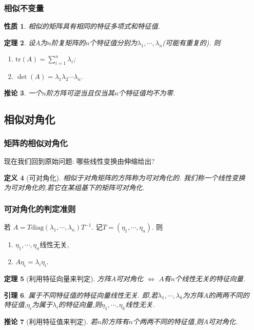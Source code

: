 \documentclass{article}
\newtheorem{theorem}{定理}  %
\newtheorem{proposition}[theorem]{性质}  %
\newtheorem{definition}[theorem]{定义}
\newtheorem{corollary}[theorem]{推论}
\newtheorem{lemma}[theorem]{引理}
\renewcommand{\blue }[1]{{\textcolor[rgb]{0,0,1}{#1}}}
\begin{document}
\subsubsection{相似不变量}
\begin{proposition}
相似的矩阵具有相同的特征多项式和特征值.
\end{proposition}
\begin{theorem}
设$A$为$n$阶复矩阵的$n$个特征值分别为$\lambda_1,\cdots,\lambda_n$(可能有重复的). 则
\begin{enumerate}
\item $\mathrm{tr}(A)=\sum_{i=1}^{n}\lambda_i$;
\item $\det(A)=\lambda_1\lambda_2\cdots\lambda_n$.
\end{enumerate}
\end{theorem}
\begin{corollary}
一个$n$阶方阵可逆当且仅当其$n$个特征值均不为零.
\end{corollary}


\subsection{相似对角化}

\subsubsection{矩阵的相似对角化}
现在我们回到原始问题: 哪些线性变换由伸缩给出?
\begin{definition}[可对角化]
相似于对角矩阵的方阵称为\blue{可对角化}的.
我们称一个线性变换为\blue{可对角化}的,若它在某组基下的矩阵可对角化.
\end{definition}

\subsubsection{可对角化的判定准则}
若 $ A=T\mathrm{diag}(\lambda_1,\cdots,\lambda_n)T^{-1}$. 记$T=(\eta_1,\cdots,\eta_n)$. 则
\begin{enumerate}
\item $\eta_1,\cdots,\eta_n$线性无关,
\item $A\eta_i=\lambda_i\eta_i$.
\end{enumerate}
\begin{theorem}[利用特征向量来判定]
方阵$A$可对角化 $\Leftrightarrow$ $A$有$n$个线性无关的特征向量.
\end{theorem}
\begin{lemma}
属于不同特征值的特征向量线性无关.
即,若$\lambda_1,\cdots,\lambda_k$为方阵$A$的两两不同的特征值,$\eta_i$为属于$\lambda_i$的特征向量,则$\eta_1,\cdots,\eta_k$线性无关.
\end{lemma}
\begin{corollary}[利用特征值来判定]
若$n$阶方阵有$n$个两两不同的特征值,则$A$可对角化.
\end{corollary}
\end{document}
